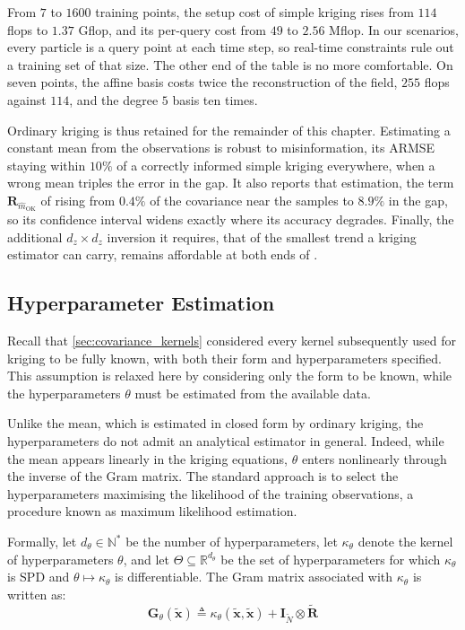From $7$ to $1600$ training points, the setup cost of simple kriging rises from $114$ flops to $1.37$ Gflop, and its per-query cost from $49$ to $2.56$ Mflop. In our scenarios, every particle is a query point at each time step, so real-time constraints rule out a training set of that size. The other end of the table is no more comfortable. On seven points, the affine basis costs twice the reconstruction of the field, $255$ flops against $114$, and the degree $5$ basis ten times.

Ordinary kriging is thus retained for the remainder of this chapter. Estimating a constant mean from the observations is robust to misinformation, its ARMSE staying within $10\%$ of a correctly informed simple kriging everywhere, when a wrong mean triples the error in the gap. It also reports that estimation, the term $\mathbf{R}_{\hat{m}_{\mathrm{OK}}}$ of  rising from $0.4\%$ of the covariance near the samples to $8.9\%$ in the gap, so its confidence interval widens exactly where its accuracy degrades. Finally, the additional $d_z\times d_z$ inversion it requires, that of the smallest trend a kriging estimator can carry, remains affordable at both ends of .

\subsection{Hyperparameter Estimation}\label{sec:HP_estimation}

Recall that \cref{sec:covariance_kernels} considered every kernel subsequently used for kriging to be fully known, with both their form and hyperparameters specified. This assumption is relaxed here by considering only the form to be known, while the hyperparameters $\theta$ must be estimated from the available data.

Unlike the mean, which is estimated in closed form by ordinary kriging, the hyperparameters do not admit an analytical estimator in general. Indeed, while the mean appears linearly in the kriging equations, $\theta$ enters nonlinearly through the inverse of the Gram matrix. The standard approach \cite{bib:Rasmussen-hyperparameters} is to select the hyperparameters maximising the likelihood of the training observations, a procedure known as maximum likelihood estimation.

Formally, let $d_\theta\in\mathbb{N}^*$ be the number of hyperparameters, let $\kappa_\theta$ denote the kernel of hyperparameters $\theta$, and let $\Theta\subseteq\mathbb{R}^{d_\theta}$ be the set of hyperparameters for which $\kappa_\theta$ is SPD and $\theta\mapsto \kappa_\theta$ is differentiable. The Gram matrix associated with $\kappa_\theta$ is written as:
\begin{equation}
	\mathbf{G}_\theta(\tilde{\mathbf{x}})\triangleq \kappa_\theta(\tilde{\mathbf{x}},\tilde{\mathbf{x}})+\mathbf{I}_{\tilde{N}}\otimes\tilde{\mathbf{R}}
\end{equation}

